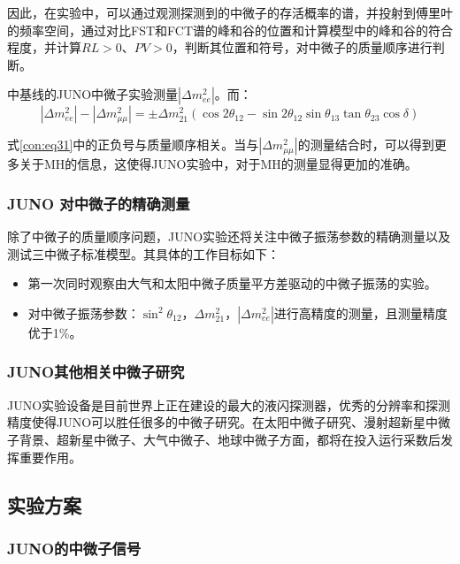 \documentclass[10pt,a4paper]{article}
\begin{document}
因此，在实验中，可以通过观测探测到的中微子的存活概率的谱，并投射到傅里叶的频率空间，通过对比FST和FCT谱的峰和谷的位置和计算模型中的峰和谷的符合程度，并计算$RL>0$、$PV>0$，判断其位置和符号，对中微子的质量顺序进行判断。


中基线的JUNO中微子实验测量$|\Delta{m_{ee}^2}|$。而：
\begin{equation}
\label{con:eq31}
|\Delta{m_{ee}^2}|-|\Delta {m^{2}_{\mu \mu}}|=\pm \Delta m_{21}^2(\cos2\theta_{12}-\sin2\theta_{12}\sin\theta_{13}\tan\theta_{23}\cos\delta)
\end{equation}


式\eqref{con:eq31}中的正负号与质量顺序相关。当与$|\Delta{m_{\mu\mu}^2}|$的测量结合时，可以得到更多关于MH的信息，这使得JUNO实验中，对于MH的测量显得更加的准确\cite{2016Neutrino}。

\subsubsection{JUNO 对中微子的精确测量}\label{sub:4}

除了中微子的质量顺序问题，JUNO实验还将关注中微子振荡参数的精确测量以及测试三中微子标准模型。其具体的工作目标如下\cite{2009Experimental}：

\begin{itemize}
	\item{第一次同时观察由大气和太阳中微子质量平方差驱动的中微子振荡的实验。}
    
    \item{对中微子振荡参数：$\sin^2{\theta_{12}}$，$\Delta m^2_{21}$，$|\Delta m^2_{ee}|$进行高精度的测量，且测量精度优于1\%。}
\end{itemize}


\subsubsection{JUNO其他相关中微子研究}

JUNO实验设备是目前世界上正在建设的最大的液闪探测器，优秀的分辨率和探测精度使得JUNO可以胜任很多的中微子研究。在太阳中微子研究、漫射超新星中微子背景、超新星中微子、大气中微子、地球中微子方面，都将在投入运行采数后发挥重要作用。

\subsection{实验方案}\label{sub:5}

\subsubsection{JUNO的中微子信号}\label{sub:6}
\end{document}
